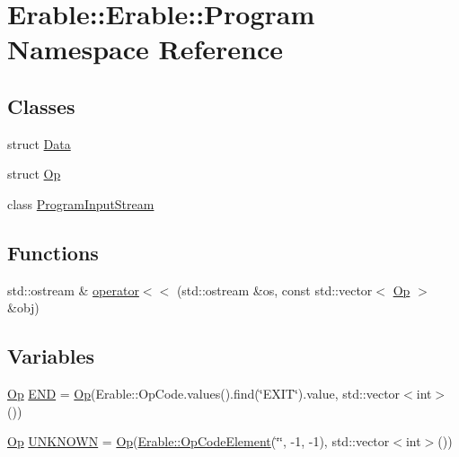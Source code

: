 \hypertarget{namespace_erable_1_1_erable_1_1_program}{}\section{Erable\+::Erable\+::Program Namespace Reference}
\label{namespace_erable_1_1_erable_1_1_program}
\subsection*{Classes}
\begin{DoxyCompactItemize}
\item 
struct \mbox{\hyperlink{struct_erable_1_1_erable_1_1_program_1_1_data}{Data}}
\item 
struct \mbox{\hyperlink{struct_erable_1_1_erable_1_1_program_1_1_op}{Op}}
\item 
class \mbox{\hyperlink{class_erable_1_1_erable_1_1_program_1_1_program_input_stream}{Program\+Input\+Stream}}
\end{DoxyCompactItemize}
\subsection*{Functions}
\begin{DoxyCompactItemize}
\item 
std\+::ostream \& \mbox{\hyperlink{namespace_erable_1_1_erable_1_1_program_a8f715de10e3b305a485ae55c84b42f28}{operator$<$$<$}} (std\+::ostream \&os, const std\+::vector$<$ \mbox{\hyperlink{struct_erable_1_1_erable_1_1_program_1_1_op}{Op}} $>$ \&obj)
\end{DoxyCompactItemize}
\subsection*{Variables}
\begin{DoxyCompactItemize}
\item 
\mbox{\hyperlink{struct_erable_1_1_erable_1_1_program_1_1_op}{Op}} \mbox{\hyperlink{namespace_erable_1_1_erable_1_1_program_aacdae80b635eff00faebbfcada20d503}{E\+ND}} = \mbox{\hyperlink{struct_erable_1_1_erable_1_1_program_1_1_op}{Op}}(Erable\+::\+Op\+Code.\+values().find(\char`\"{}E\+X\+IT\char`\"{}).value, std\+::vector$<$int$>$())
\item 
\mbox{\hyperlink{struct_erable_1_1_erable_1_1_program_1_1_op}{Op}} \mbox{\hyperlink{namespace_erable_1_1_erable_1_1_program_a1b21e2b94fc7f93fe5d530904f72f746}{U\+N\+K\+N\+O\+WN}} = \mbox{\hyperlink{struct_erable_1_1_erable_1_1_program_1_1_op}{Op}}(\mbox{\hyperlink{class_erable_1_1_op_code_element}{Erable\+::\+Op\+Code\+Element}}(\char`\"{}\char`\"{}, -\/1, -\/1), std\+::vector$<$int$>$())
\end{DoxyCompactItemize}


